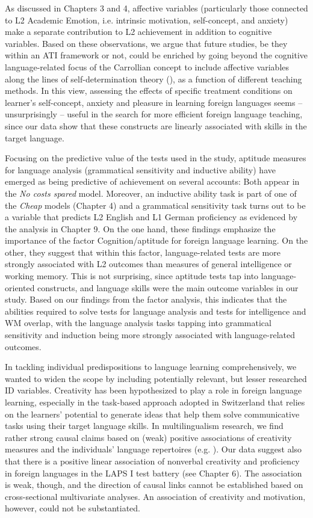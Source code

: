 \documentclass[output=paper]{langsci/langscibook}
\begin{document}
As discussed in Chapters 3 and 4, affective variables (particularly those connected to L2 Academic Emotion, i.e. intrinsic motivation, self-concept, and anxiety) make a separate contribution to L2 achievement in addition to cognitive variables. Based on these observations, we argue that future studies, be they within an ATI framework or not, could be enriched by going beyond the cognitive language-related focus of the Carrollian concept to include affective variables along the lines of self-determination theory (\citealt{DeciRyan2002}), as a function of different teaching methods. In this view, assessing the effects of specific treatment conditions on learner’s self-concept, anxiety and pleasure in learning foreign languages seems – unsurprisingly – useful in the search for more efficient foreign language teaching, since our data show that these constructs are linearly associated with skills in the target language. 

Focusing on the predictive value of the tests used in the study, aptitude measures for language analysis (grammatical sensitivity and inductive ability) have emerged as being predictive of achievement on several accounts: Both appear in the \textit{No costs spared} model. Moreover, an inductive ability task is part of one of the \textit{Cheap} models (Chapter 4) and a grammatical sensitivity task turns out to be a variable that predicts L2 English and L1 German proficiency as evidenced by the analysis in Chapter 9. On the one hand, these findings emphasize the importance of the factor Cognition/aptitude for foreign language learning. On the other, they suggest that within this factor, language-related tests are more strongly associated with L2 outcomes than measures of general intelligence or working memory. This is not surprising, since aptitude tests tap into language-oriented constructs, and language skills were the main outcome variables in our study. Based on our findings from the factor analysis, this indicates that the abilities required to solve tests for language analysis and tests for intelligence and WM overlap, with the language analysis tasks tapping into grammatical sensitivity and induction being more strongly associated with language-related outcomes. 

In tackling individual predispositions to language learning comprehensively, we wanted to widen the scope by including potentially relevant, but lesser researched ID variables. Creativity has been hypothesized to play a role in foreign language learning, especially in the task-based approach adopted in Switzerland that relies on the learners’ potential to generate ideas that help them solve communicative tasks using their target language skills. In multilingualism research, we find rather strong causal claims based on (weak) positive associations of creativity measures and the individuals’ language repertoires (e.g. \citealt{FuerstGrin2018}). Our data suggest also that there is a positive linear association of nonverbal creativity and proficiency in foreign languages in the LAPS I test battery (see Chapter 6). The association is weak, though, and the direction of causal links cannot be established based on cross-sectional multivariate analyses. An association of creativity and motivation, however, could not be substantiated. 
\end{document}
